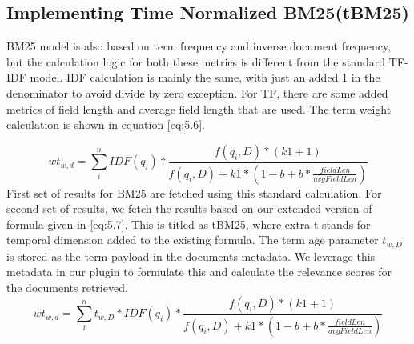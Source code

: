\subsection{Implementing Time Normalized BM25(tBM25)}
BM25 model is also based on term frequency and inverse document frequency, but the calculation logic for both these metrics is different from the standard TF-IDF model. IDF calculation is mainly the same, with just an added 1 in the denominator to avoid divide by zero exception. For TF, there are some added metrics of field length and average field length that are used. The term weight calculation is shown in equation \ref{eq:5.6}. 

\begin{equation} \label{eq:5.6}
    wt_{w,d} = \sum_{i}^{n}IDF(q_{i}) * \frac{f(q_{i},D)*(k1+1)}{f(q_{i},D)+k1*(1-b+b*\frac{fieldLen}{avgFieldLen})}
\end{equation}
First set of results for BM25 are fetched using this standard calculation. For second set of results, we fetch the results based on our extended version of formula given in \ref{eq:5.7}. This is titled as tBM25, where extra t stands for temporal dimension added to the existing formula. The term age parameter $t_{w,D}$ is stored as the term payload in the documents metadata. We leverage this metadata in our plugin to formulate this and calculate the relevance scores for the documents retrieved.
\begin{equation} \label{eq:5.7}
    wt_{w,d} = \sum_{i}^{n} t_{w,D}*IDF(q_{i}) * \frac{f(q_{i},D)*(k1+1)}{f(q_{i},D)+k1*(1-b+b*\frac{fieldLen}{avgFieldLen})}
\end{equation}

